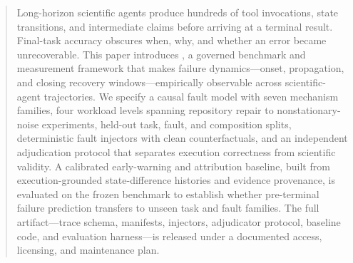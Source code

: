 \begin{abstract}
\label{sec:abstract}

Long-horizon scientific agents produce hundreds of tool invocations, state
transitions, and intermediate claims before arriving at a terminal result.
Final-task accuracy obscures when, why, and whether an error became
unrecoverable. This paper introduces \systemname, a governed benchmark
and measurement framework that makes failure dynamics—onset, propagation,
and closing recovery windows—empirically observable across scientific-agent
trajectories. We specify a causal fault model with seven mechanism families,
four workload levels spanning repository repair to nonstationary-noise
experiments, held-out task, fault, and composition splits, deterministic
fault injectors with clean counterfactuals, and an independent adjudication
protocol that separates execution correctness from scientific validity. A
calibrated early-warning and attribution baseline, built from
execution-grounded state-difference histories and evidence provenance,
is evaluated on the frozen benchmark to establish whether pre-terminal
failure prediction transfers to unseen task and fault families. The full
artifact—trace schema, manifests, injectors, adjudicator protocol, baseline
code, and evaluation harness—is released under a documented access,
licensing, and maintenance plan.

\end{abstract}

